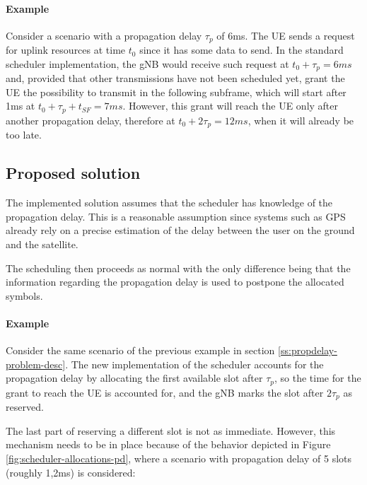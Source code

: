 \paragraph{Example} Consider a scenario with a propagation delay $\tau_p$ of 6ms. The \ac{UE} sends a request for uplink resources at time $t_0$ since it has some data to send. In the standard scheduler implementation, the \ac{gNB} would receive such request at $t_0+\tau_p=6\textit{ms}$ and, provided that other transmissions have not been scheduled yet, grant the \ac{UE} the possibility to transmit in the following subframe, which will start after 1ms at $t_0+\tau_p+t_{\textit{SF}}=7\textit{ms}$. However, this grant will reach the \ac{UE} only after another propagation delay, therefore at $t_0+2\tau_p=12\textit{ms}$, when it will already be too late.

\subsection{Proposed solution}
\label{ss:propdelay-problem-sol}
The implemented solution assumes that the scheduler has knowledge of the propagation delay. This is a reasonable assumption since systems such as GPS already rely on a precise estimation of the delay between the user on the ground and the satellite.

The scheduling then proceeds as normal with the only difference being that the information regarding the propagation delay is used to postpone the allocated symbols. 

\paragraph{Example} Consider the same scenario of the previous example in section \ref{ss:propdelay-problem-desc}. The new implementation of the scheduler accounts for the propagation delay by allocating the first available slot after $\tau_p$, so the time for the grant to reach the \ac{UE} is accounted for, and the \ac{gNB} marks the slot after $2\tau_p$ as reserved.

The last part of reserving a different slot is not as immediate. However, this mechanism needs to be in place because of the behavior depicted in Figure \ref{fig:scheduler-allocations-pd}, where a scenario with propagation delay of 5 slots (roughly 1,2ms) is considered:


